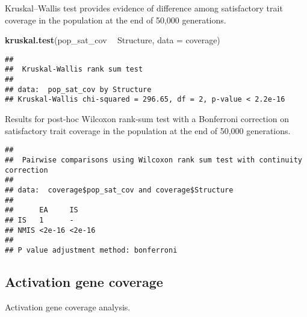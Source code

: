 \documentclass[]{book}
\newenvironment{Shaded}{\begin{snugshade}}{\end{snugshade}}
\newcommand{\DataTypeTok}[1]{\textcolor[rgb]{0.13,0.29,0.53}{#1}}
\newcommand{\KeywordTok}[1]{\textcolor[rgb]{0.13,0.29,0.53}{\textbf{#1}}}
\newcommand{\NormalTok}[1]{#1}
\newcommand{\OperatorTok}[1]{\textcolor[rgb]{0.81,0.36,0.00}{\textbf{#1}}}
\newcommand{\OtherTok}[1]{\textcolor[rgb]{0.56,0.35,0.01}{#1}}
\newcommand{\StringTok}[1]{\textcolor[rgb]{0.31,0.60,0.02}{#1}}
\begin{document}
Kruskal--Wallis test provides evidence of difference among satisfactory trait coverage in the population at the end of 50,000 generations.

\begin{Shaded}
\begin{Highlighting}[]
\KeywordTok{kruskal.test}\NormalTok{(pop_sat_cov }\OperatorTok{~}\StringTok{ }\NormalTok{Structure, }\DataTypeTok{data =}\NormalTok{ coverage)}
\end{Highlighting}
\end{Shaded}

\begin{verbatim}
## 
##  Kruskal-Wallis rank sum test
## 
## data:  pop_sat_cov by Structure
## Kruskal-Wallis chi-squared = 296.65, df = 2, p-value < 2.2e-16
\end{verbatim}

Results for post-hoc Wilcoxon rank-sum test with a Bonferroni correction on satisfactory trait coverage in the population at the end of 50,000 generations.

\begin{Shaded}
\end{Shaded}

\begin{verbatim}
## 
##  Pairwise comparisons using Wilcoxon rank sum test with continuity correction 
## 
## data:  coverage$pop_sat_cov and coverage$Structure 
## 
##      EA     IS    
## IS   1      -     
## NMIS <2e-16 <2e-16
## 
## P value adjustment method: bonferroni
\end{verbatim}

\hypertarget{activation-gene-coverage-12}{%
\subsection{Activation gene coverage}\label{activation-gene-coverage-12}}

Activation gene coverage analysis.
\end{document}
